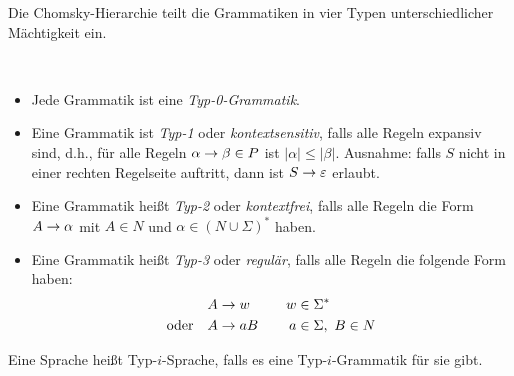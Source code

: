 \bigskip

Die Chomsky-Hierarchie teilt die Grammatiken in vier Typen unterschiedlicher Mächtigkeit ein.
\begin{Def}\
	\begin{itemize}
	\item Jede Grammatik ist eine \emph{Typ-0-Grammatik}.
	\item Eine Grammatik ist \emph{Typ-1} oder
          \emph{kontextsensitiv}, falls alle Regeln expansiv sind,
          d.h., für alle Regeln $\alpha\->\beta\in P$ ist
          $|\alpha|\leq |\beta|$. Ausnahme: falls $S$ nicht in einer
          rechten Regelseite auftritt, dann ist $S\->\Eps$ erlaubt. 
	\item Eine Grammatik heißt \emph{Typ-2} oder \emph{kontextfrei}, falls alle Regeln die Form $A\->\alpha$ mit $A\in N$ und $\alpha\in(N\cup\Sigma)^*$ haben.
	\item Eine Grammatik heißt \emph{Typ-3} oder \emph{regulär}, falls alle Regeln die folgende Form haben:
	\begin{alignat*}{2}
		&A\->w &\quad w&\in\Sigma^*\\
		\text{oder}\quad &A\->aB& a&\in\Sigma,\ B\in N
	\end{alignat*}
	\end{itemize}
	Eine Sprache heißt Typ-$i$-Sprache, falls es eine Typ-$i$-Grammatik für sie gibt.
\end{Def}

